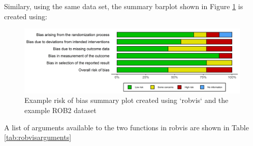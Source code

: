 \documentclass[a4paper, twoside]{templates/ociamthesis}
\begin{document}
Similary, using the same data set, the summary barplot shown in Figure \ref{fig:summaryplot} is created using:

\begin{figure}
\includegraphics[width=1\linewidth]{figures/sys-rev-tools/example-rob-summary-barplot} \caption{Example risk of bias summary plot created using `robvis` and the example ROB2 dataset}\label{fig:summaryplot}
\end{figure}

A list of arguments available to the two functions in robvis are shown in Table \ref{tab:robvisarguments}

\begingroup\fontsize{9}{11}\selectfont
\end{document}
